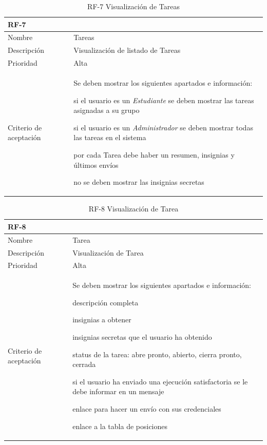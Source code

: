 \documentclass[11pt,spanish,listoffigures,listoftables]{tfgetsinf}
\begin{document}
\begin{table}
	\centering
	\begin{tabular}{ |p{4cm}||p{10cm}|  }
		\multicolumn{2}{l}{\textbf{RF-7}} \\
		\hline
		Nombre   & Tareas \\
		\hline
		Descripción  & Visualización de listado de Tareas \\
		\hline
		Prioridad &  Alta\\
		\hline
		Criterio de aceptación & Se deben mostrar los siguientes apartados e información: \newline  
		\begin{tabitem}
			\item si el usuario es un \textit{Estudiante} se deben mostrar las tareas asignadas a su grupo
			\item si el usuario es un \textit{Administrador} se deben mostrar todas las tareas en el sistema
			\item por cada Tarea debe haber un resumen, insignias y últimos envíos
			\item no se deben mostrar las insignias secretas
		\end{tabitem} \\
		\hline
	\end{tabular}
	\caption{RF-7 Visualización de Tareas}
	\label{table:7}
\end{table}

\begin{table}
	\centering
	\begin{tabular}{ |p{4cm}||p{10cm}|  }
		\multicolumn{2}{l}{\textbf{RF-8}} \\
		\hline
		Nombre   & Tarea \\
		\hline
		Descripción  & Visualización de Tarea \\
		\hline
		Prioridad &  Alta\\
		\hline
		Criterio de aceptación & Se deben mostrar los siguientes apartados e información: \newline  
		\begin{tabitem}
			\item descripción completa
			\item insignias a obtener
			\item insignias secretas que el usuario ha obtenido
			\item status de la tarea: abre pronto, abierto, cierra pronto, cerrada
			\item si el usuario ha enviado una ejecución satisfactoria se le debe informar en un mensaje
			\item enlace para hacer un envío con sus credenciales
			\item enlace a la tabla de posiciones
		\end{tabitem} \\
		\hline
	\end{tabular}
	\caption{RF-8 Visualización de Tarea}
	\label{table:8}
\end{table}
\end{document}
